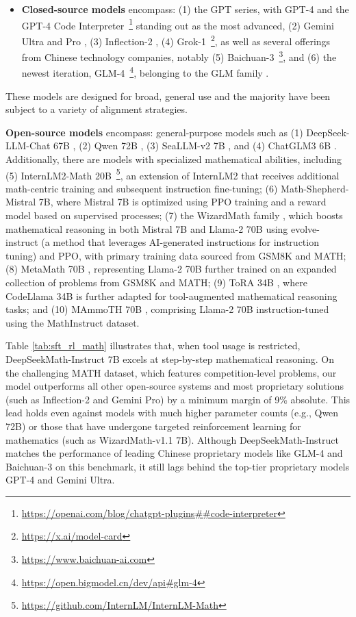 \begin{itemize}[topsep=0pt]
    \item \textbf{Closed-source models} encompass: (1) the GPT series, with GPT-4 \citep{gpt4} and the GPT-4 Code Interpreter~\footnote{\url{https://openai.com/blog/chatgpt-plugins\#\#code-interpreter}} standing out as the most advanced, (2) Gemini Ultra and Pro \citep{gemini}, (3) Inflection-2 \citep{inflection-2}, (4) Grok-1~\footnote{\url{https://x.ai/model-card}}, as well as several offerings from Chinese technology companies, notably (5) Baichuan-3~\footnote{\url{https://www.baichuan-ai.com}}, and (6) the newest iteration, GLM-4~\footnote{\url{https://open.bigmodel.cn/dev/api\#glm-4}}, belonging to the GLM family \citep{glm}.
\end{itemize}

These models are designed for broad, general use and the majority have been subject to a variety of alignment strategies.

\item \textbf{Open-source models} encompass: general-purpose models such as (1) DeepSeek-LLM-Chat 67B \citep{deepseek-llm}, (2) Qwen 72B \citep{qwen}, (3) SeaLLM-v2 7B \citep{seallm}, and (4) ChatGLM3 6B \citep{chatglm3}. Additionally, there are models with specialized mathematical abilities, including (5) InternLM2-Math 20B~\footnote{\url{https://github.com/InternLM/InternLM-Math}}, an extension of InternLM2 that receives additional math-centric training and subsequent instruction fine-tuning; (6) Math-Shepherd-Mistral 7B, where Mistral 7B \citep{mistral} is optimized using PPO training \citep{schulman2017proximal} and a reward model based on supervised processes; (7) the WizardMath family \citep{wizardmath}, which boosts mathematical reasoning in both Mistral 7B and Llama-2 70B \citep{llama2} using evolve-instruct (a method that leverages AI-generated instructions for instruction tuning) and PPO, with primary training data sourced from GSM8K and MATH; (8) MetaMath 70B \citep{metamath}, representing Llama-2 70B further trained on an expanded collection of problems from GSM8K and MATH; (9) ToRA 34B \cite{tora}, where CodeLlama 34B is further adapted for tool-augmented mathematical reasoning tasks; and (10) MAmmoTH 70B \citep{MathInstruct}, comprising Llama-2 70B instruction-tuned using the MathInstruct dataset.

Table \ref{tab:sft_rl_math} illustrates that, when tool usage is restricted, DeepSeekMath-Instruct 7B excels at step-by-step mathematical reasoning. On the challenging MATH dataset, which features competition-level problems, our model outperforms all other open-source systems and most proprietary solutions (such as Inflection-2 and Gemini Pro) by a minimum margin of 9\% absolute. This lead holds even against models with much higher parameter counts (e.g., Qwen 72B) or those that have undergone targeted reinforcement learning for mathematics (such as WizardMath-v1.1 7B). Although DeepSeekMath-Instruct matches the performance of leading Chinese proprietary models like GLM-4 and Baichuan-3 on this benchmark, it still lags behind the top-tier proprietary models GPT-4 and Gemini Ultra.

